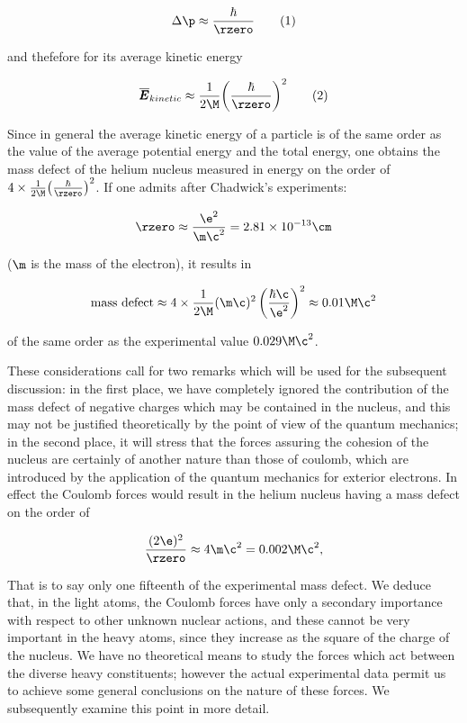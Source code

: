 \documentclass{article}
\newcommand{\var}[1]{\pmb{#1}}
\newcommand{\ee}[2]{{{#1}\times 10^{#2}}}
\newcommand{\E}{\var{E}}
\newcommand{\avg}[1]{\overline{#1}}
\newcommand{\KEavg}{{\avg{\E}_{kinetic}}}
\newcommand{\valKEavg}{
    \frac{1}{2\M} {\left( \frac{\hbar}{\rzero} \right)}^2
}
\newcommand{\valrzero}{\frac{\e^2}{\m\c^2}}
\newcommand{\iFSC}{\frac{\hbar\c}{\e^2}}
\newcommand{\nequ}[2]{
\begin{equation*}
#1
\tag{#2}
\end{equation*}
}
\newcommand{\uequ}[1]{
\begin{equation*}
#1
\end{equation*}
}
\begin{document}
\nequ{
\Delta\p \approx \frac{\hbar}{\rzero}
}{1}

and thefefore for its average kinetic energy

\nequ{
\KEavg \approx \valKEavg
}{2}

Since in general the average kinetic energy of a particle is of the same order as the value of the average potential energy and the total energy, one obtains the mass defect of the helium nucleus measured in energy on the order of $4\times\valKEavg$. If one admits after Chadwick's experiments:

\uequ{
\rzero \approx \valrzero = \ee{2.81}{-13}\cm
}

($\m$ is the mass of the electron), it results in
\uequ{
\text{mass defect} \approx 4\times\frac{1}{2\M}(\m\c)^2\left( \iFSC \right)^2 \approx 0.01\M\c^2
}

of the same order as the experimental value $0.029\M\c^2$.

These considerations call for two remarks which will be used for the subsequent discussion: in the first place, we have completely ignored the contribution of the mass defect of negative charges which may be contained in the nucleus, and this may not be justified theoretically by the point of view of the quantum mechanics; in the second place, it will stress that the forces assuring the cohesion of the nucleus are certainly of another nature than those of coulomb, which are introduced by the application of the quantum mechanics for exterior electrons. In effect the Coulomb forces would result in the helium nucleus having a mass defect on the order of

\uequ{
\frac{(2\e)^2}{\rzero} \approx 4\m\c^2 = 0.002\M\c^2,
}

That is to say only one fifteenth of the experimental mass defect. We deduce that, in the light atoms, the Coulomb forces have only a secondary importance with respect to other unknown nuclear actions, and these cannot be very important in the heavy atoms, since they increase as the square of the charge of the nucleus. We have no theoretical means to study the forces which act between the diverse heavy constituents; however the actual experimental data permit us to achieve some general conclusions on the nature of these forces. We subsequently examine this point in more detail.
\end{document}
